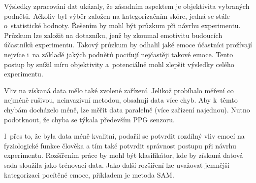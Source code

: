     \vspace{3mm}
    
    
    Výsledky zpracování dat ukázaly, že zásadním aspektem je objektivita vybraných podnětů. Ačkoliv byl výběr založen na kategorizačním skóre, jedná se stále o~statistické hodnoty. Řešením by mohl být průzkum při návrhu experimentu. Průzkum lze založit na dotazníku, jenž by zkoumal emotivitu budoucích účastníků experimentu. Takový průzkum by odhalil jaké emoce účastníci prožívají nejvíce i~na základě jakých podnětů pociťují nejčastěji takové emoce. Tento postup by snížil míru objektivity a~potenciálně mohl zlepšit výsledky celého experimentu.
    
    Vliv na získaná data mělo také zvolené zařízení. Jelikož probíhalo měření co nejméně rušivou, neinvazivní metodou, obsahují data více chyb. Aby k~těmto chybám docházelo méně, lze měřit data paralelně (více zařízení najednou). Nutno podotknout, že chyba se týkala především PPG senzoru. 
    
    I~přes to, že byla data méně kvalitní, podařil se potvrdit rozdílný vliv emocí na fyziologické funkce člověka a tím také potvrdit správnost postupu při návrhu experimentu. Rozšířením práce by mohl být klasifikátor, kde by získaná datová sada sloužila jako trénovací data. Jako další rozšíření lze uvažovat jemnější kategorizaci pocítěné emoce, příkladem je metoda SAM.  
    
    
    
    
    
   
    
    
    
    